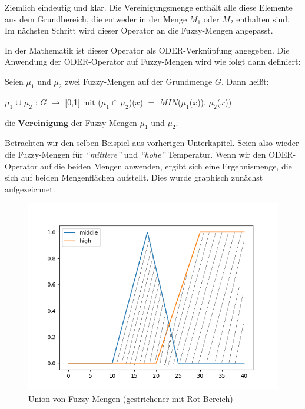 Ziemlich eindeutig und klar. Die Vereinigungsmenge enthält alle diese Elemente aus dem Grundbereich, die entweder in der Menge $M_1$ oder $M_2$ enthalten sind. Im nächsten Schritt wird dieser Operator an die Fuzzy-Mengen angepasst.

In der Mathematik ist dieser Operator als ODER-Verknüpfung angegeben. Die Anwendung der ODER-Operator auf Fuzzy-Mengen wird wie folgt dann definiert:


\begin{definition}
	Seien $\mu_1$ und $\mu_2$ zwei Fuzzy-Mengen auf der Grundmenge $G$. Dann heißt:
	\begin{center}
		$\mu_1$ $\cup$ $\mu_2$ : $G$ $\rightarrow$ [0,1] $\text{mit}$  ($\mu_1$ $\cap$ $\mu_2$)($x$) $=$ $MIN$($\mu_1$($x$)), $\mu_2$($x$)) 
	\end{center}
	die $\textbf{Vereinigung}$ der Fuzzy-Mengen $\mu_1$ und $\mu_2$.
\end{definition}

Betrachten wir den selben Beispiel aus vorherigen Unterkapitel. Seien also wieder die Fuzzy-Mengen für \textit{``mittlere''} und \textit{``hohe''} Temperatur. Wenn wir den ODER-Operator auf die beiden Mengen anwenden, ergibt sich eine Ergebnismenge, die sich auf beiden Mengenflächen aufstellt. Dies wurde graphisch zunächst aufgezeichnet.

\begin{figure}[htbp]
	\centering
	\includegraphics[scale=0.5]{images/oder_mid_high_temp.png}
	\caption{Union von Fuzzy-Mengen (gestrichener mit Rot Bereich)}
\end{figure}\label{high_low_temp_union}

